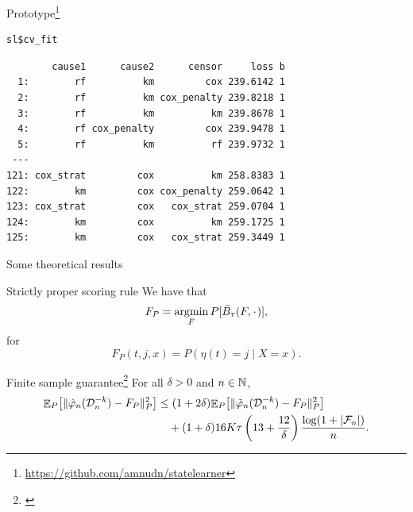 \documentclass[smaller]{beamer}\usepackage{listings}
\begin{document}
\begin{frame}[label={sec:orgb6fa0a6},fragile]{Prototype\footnote{\url{https://github.com/amnudn/statelearner}}}
\begin{onlyenv}
\lstset{language=r,label= ,caption= ,captionpos=b,numbers=none}
\begin{lstlisting}
sl$cv_fit
\end{lstlisting}

\begin{verbatim}
        cause1      cause2      censor     loss b
  1:        rf          km         cox 239.6142 1
  2:        rf          km cox_penalty 239.8218 1
  3:        rf          km          km 239.8678 1
  4:        rf cox_penalty         cox 239.9478 1
  5:        rf          km          rf 239.9732 1
 ---                                             
121: cox_strat         cox          km 258.8383 1
122:        km         cox cox_penalty 259.0642 1
123: cox_strat         cox   cox_strat 259.0704 1
124:        km         cox          km 259.1725 1
125:        km         cox   cox_strat 259.3449 1
\end{verbatim}
\end{onlyenv}
\end{frame}

\begin{frame}[label={sec:org71751bc}]{Some theoretical results}
\small \pause

\begin{block}{Strictly proper scoring rule}
We have that
\begin{equation*}
  F_P = \argmin_{F} P{[ \bar{B}_{\tau}(F, \blank)]},
\end{equation*}
for
\begin{equation*}
  F_P(t, j, x) = P(\eta(t) = j \mid X=x).
\end{equation*}

\hfill \pause
\end{block}

\begin{block}{Finite sample guarantee\footnote{\cite{van2003unicv,van2006oracle}}}
For all $\delta > 0$ and $n \in \mathbb{N}$,
\begin{align*}
  {\ensuremath{\mathop{{\mathbb{E}}}}}_{P}{\left[ \Vert \hat{\varphi}_n(\mathcal{D}_n^{-k}) - F_P \Vert_{P}^2 \right]}
  & \leq (1 + 2\delta)
    {\mathop{{\mathbb{E}}}}_{P}{\left[ \Vert \tilde{\varphi}_n(\mathcal{D}_n^{-k}) - F_P \Vert_{P}^2 \right]}
  \\
  & \quad
    + (1+ \delta) 16   K \tau
    \left(
    13 + \frac{12}{\delta}
    \right)
    \frac{\log(1 + |\mathcal{F}_n|)}{n}.
\end{align*}
\end{block}
\end{frame}
\end{document}
